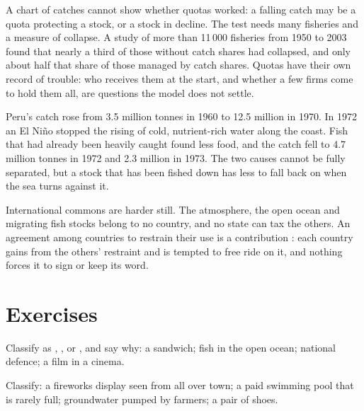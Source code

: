 A chart of catches cannot show whether quotas worked: a falling catch may be a quota protecting a stock, or a stock in decline. The test needs many fisheries and
a measure of collapse. A study of more than 11\,000 fisheries from 1950 to 2003 found that nearly a third of those without catch shares had collapsed, and only about
half that share of those managed by catch shares. Quotas have their own record of trouble: who receives them at the start, and whether a few firms come to hold them
all, are questions the model does not settle.

\begin{record}
Peru's catch rose from 3.5 million tonnes in 1960 to 12.5 million in 1970. In 1972 an El Niño stopped the rising
of cold, nutrient-rich water along the coast. Fish that had already been heavily caught found less food, and the catch fell to 4.7 million tonnes in 1972 and 2.3
million in 1973. The two causes cannot be fully separated, but a stock that has been fished down has less to fall back on when the sea turns against it.
\end{record}

International commons are harder still. The atmosphere, the open ocean and migrating fish stocks belong to no country, and no state can tax the others. An agreement
among countries to restrain their use is a contribution : each country gains from the others' restraint and is tempted to free ride on it, and nothing forces it
to sign or keep its word.

\section{Exercises}

\begin{exercise}[$\star$]\label{exo:g11:public-goods-and-commons:1}
Classify as , ,  or , and say why: a sandwich; fish in the open ocean; national defence; a film in a cinema.
\end{exercise}

\begin{exercise}[$\star$]\label{exo:g11:public-goods-and-commons:2}
Classify: a fireworks display seen from all over town; a paid swimming pool that is rarely full; groundwater pumped by farmers; a pair of shoes.
\end{exercise}

